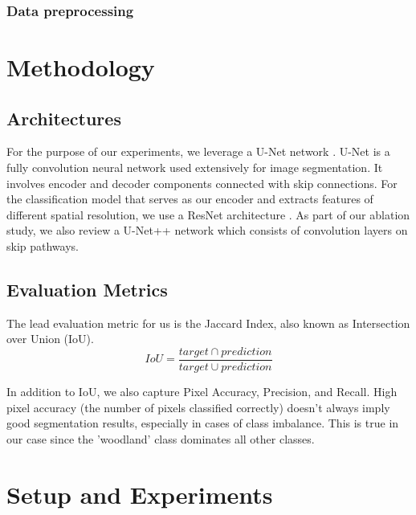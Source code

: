 \documentclass[sigconf, nonacm]{acmart}
\begin{document}
\subsubsection{Data preprocessing}


\section{Methodology}
\subsection{Architectures}

For the purpose of our experiments, we leverage a U-Net network \cite{ronneberger2015unet}. U-Net is a fully convolution neural network used extensively for image segmentation. It involves encoder and decoder components connected with skip connections. For the classification model that serves as our encoder and extracts features of different spatial resolution, we use a ResNet architecture \cite{DBLP:journals/corr/HeZRS15}. As part of our ablation study, we also review a U-Net++ network \cite{DBLP:journals/corr/abs-1807-10165} which consists of convolution layers on skip pathways.

\subsection{Evaluation Metrics}
 The lead evaluation metric for us is the Jaccard Index, also known as Intersection over Union (IoU).
\begin{equation*}
    IoU=\frac{target \cap prediction}{target \cup prediction}
\end{equation*}

In addition to IoU, we also capture Pixel Accuracy, Precision, and Recall. High pixel accuracy (the number of pixels classified correctly) doesn't always imply good segmentation results, especially in cases of class imbalance. This is true in our case since the 'woodland' class dominates all other classes.

\section{Setup and Experiments}
\end{document}
